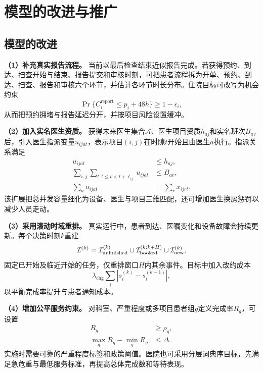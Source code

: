 \section{模型的改进与推广}

\subsection{模型的改进}

\textbf{（1）补充真实报告流程。} 当前以最后检查结束近似报告完成。若获得预约、到达、扫查开始与结束、报告提交和审核时刻，可把患者流程拆为开单、预约、到达、扫查、报告和审核六个环节，并估计各环节时长分布。住院目标可改写为机会约束
\begin{equation}
\Pr\{C_i^{\mathrm{report}}\le p_i+48\unit{h}\}\ge1-\epsilon_i,
\end{equation}
从而把预约拥堵与报告延迟分开，并按项目风险设置缓冲。

\textbf{（2）加入实名医生资质。} 获得未来医生集合$\mathcal A$、医生项目资质$h_{aj}$和实名班次$B_{av}$后，引入医生指派变量$u_{ijat}$，表示项目$(i,j)$在时隙$t$开始且由医生$a$执行。指派关系满足
\begin{align}
u_{ijat}&\le h_{aj},\\
\sum_{i,j}\sum_{t:t\le v<t+\ell_{ij}}u_{ijat}&\le B_{av},\\
\sum_a u_{ijat}&=\sum_r x_{ijrt}.
\end{align}
该扩展把总并发容量细化为设备、医生与项目三维匹配，还可增加医生换房惩罚以减少人员走动。

\textbf{（3）采用滚动时域重排。} 真实运行中，患者到达、医嘱变化和设备故障会持续更新。每个决策时刻$k$重建
\begin{equation}
\mathcal{I}^{(k)}=\mathcal{I}_{\mathrm{unfinished}}^{(k)}\cup
\mathcal{I}_{\mathrm{booked}}^{(k:k+H)}\cup
\mathcal{I}_{\mathrm{new}}^{(k)},
\end{equation}
固定已开始及临近开始的任务，仅重排窗口$H$内其余事件。目标中加入改约成本
\begin{equation}
\lambda_{\mathrm{chg}}\sum_i\left|s_i^{(k)}-s_i^{(k-1)}\right|,
\end{equation}
以平衡完成率提升与患者通知成本。

\textbf{（4）增加公平服务约束。} 对科室、严重程度或多项目患者组$g$定义完成率$R_g$，可设置
\begin{align}
R_g&\ge\rho_g,\\
\max_gR_g-\min_gR_g&\le\Delta.
\end{align}
实施时需要可靠的严重程度标签和政策阈值。医院也可采用分层词典序目标，先满足急危重与最低服务标准，再提高总体完成数和等待表现。

